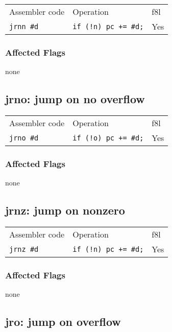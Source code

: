 \documentclass{book}
\begin{document}
\begin{tabular}{l l l}
Assembler code    & Operation                   & f8l \\
\texttt{jrnn \#d} & \texttt{if (!n) pc += \#d;} & Yes \\
\end{tabular}

\subsubsection*{Affected Flags}

none


\subsection{jrno: jump on no overflow}

\begin{tabular}{l l l}
Assembler code    & Operation                   & f8l \\
\texttt{jrno \#d} & \texttt{if (!o) pc += \#d;} & Yes \\
\end{tabular}

\subsubsection*{Affected Flags}

none


\subsection{jrnz: jump on nonzero}

\begin{tabular}{l l l}
Assembler code    & Operation                   & f8l \\
\texttt{jrnz \#d} & \texttt{if (!n) pc += \#d;} & Yes \\
\end{tabular}

\subsubsection*{Affected Flags}

none


\subsection{jro: jump on overflow}
\end{document}
